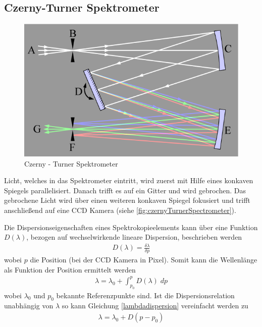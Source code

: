   \subsection{Czerny-Turner Spektrometer}
    \begin{figure}[H]
    	\centering
    	\includegraphics[scale=0.5]{parts/czernyTurnerSpectrometer_Wikipedia}
    	\caption{Czerny - Turner Spektrometer}\label{fig:czernyTurnerSpectrometer}
    \end{figure}

    Licht, welches in das Spektrometer eintritt, wird zuerst mit Hilfe eines konkaven Spiegels parallelisiert. Danach trifft es auf ein Gitter und wird gebrochen. Das gebrochene Licht wird über einen weiteren konkaven Spiegel fokusiert und trifft anschließend auf eine CCD Kamera (siehe \autoref{fig:czernyTurnerSpectrometer}).

    Die Dispersionseigenschaften eines Spektrokopieelements kann über eine Funktion $D(\lambda)$, bezogen auf wechselwirkende lineare Dispersion, beschrieben werden
    \begin{align}
    	D(\lambda) = \frac{\delta \lambda}{\delta p}
    \end{align}
    wobei $p$ die Position (bei der CCD Kamera in Pixel). Somit kann die Wellenlänge als Funktion der Position ermittelt werden
    \begin{align}
    	\lambda = \lambda_0 + \int_{p_0}^{p} D(\lambda) \; dp \label{lambdadispersion}
    \end{align}
    wobei $\lambda_0$ und $p_0$ bekannte Referenzpunkte sind. Ist die Dispersionsrelation unabhängig von $\lambda$ so kann Gleichung \eqref{lambdadispersion} vereinfacht werden zu
    \begin{align}
    	\lambda = \lambda_0 + D(p - p_0)
    \end{align}

